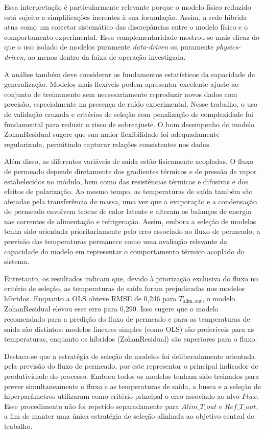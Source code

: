 Essa interpretação é particularmente relevante porque o modelo físico reduzido está sujeito a simplificações inerentes à sua formulação. Assim, a rede híbrida atua como um corretor sistemático das discrepâncias entre o modelo físico e o comportamento experimental. Essa complementaridade mostrou-se mais eficaz do que o uso isolado de modelos puramente \textit{data-driven} ou puramente \textit{physics-driven}, ao menos dentro da faixa de operação investigada.

A análise também deve considerar os fundamentos estatísticos da capacidade de generalização. Modelos mais flexíveis podem apresentar excelente ajuste ao conjunto de treinamento sem necessariamente reproduzir novos dados com precisão, especialmente na presença de ruído experimental. Nesse trabalho, o uso de validação cruzada e critérios de seleção com penalização de complexidade foi fundamental para reduzir o risco de sobreajuste. O bom desempenho do modelo ZohanResidual sugere que sua maior flexibilidade foi adequadamente regularizada, permitindo capturar relações consistentes nos dados.


Além disso, as diferentes variáveis de saída estão fisicamente acopladas. O fluxo de permeado depende diretamente dos gradientes térmicos e de pressão de vapor estabelecidos no módulo, bem como das resistências térmicas e difusivas e dos efeitos de polarização. Ao mesmo tempo, as temperaturas de saída também são afetadas pela transferência de massa, uma vez que a evaporação e a condensação do permeado envolvem trocas de calor latente e alteram os balanços de energia nas correntes de alimentação e refrigeração. Assim, embora a seleção de modelos tenha sido orientada prioritariamente pelo erro associado ao fluxo de permeado, a previsão das temperaturas permanece como uma avaliação relevante da capacidade do modelo em representar o comportamento térmico acoplado do sistema.

Entretanto, os resultados indicam que, devido à priorização exclusiva do fluxo no critério de seleção, as temperaturas de saída foram prejudicadas nos modelos híbridos. Enquanto a OLS obteve RMSE de 0,246 para $T_{\mathrm{alim,out}}$, o modelo ZohanResidual elevou esse erro para 0,290. Isso sugere que o modelo recomendado para a predição do fluxo de permeado e para as temperaturas de saída são distintos: modelos lineares simples (como OLS) são preferíveis para as temperaturas, enquanto os híbridos (ZohanResidual) são superiores para o fluxo.

Destaca-se que a estratégia de seleção de modelos foi deliberadamente orientada pela previsão do fluxo de permeado, por este representar o principal indicador de produtividade do processo. Embora todos os modelos tenham sido treinados para prever simultaneamente o fluxo e as temperaturas de saída, a busca e a seleção de hiperparâmetros utilizaram como critério principal o erro associado ao alvo $Flux$. Esse procedimento não foi repetido separadamente para $Alim\_T\_out$ e $Ref\_T\_out$, a fim de manter uma única estratégia de seleção alinhada ao objetivo central do trabalho.

